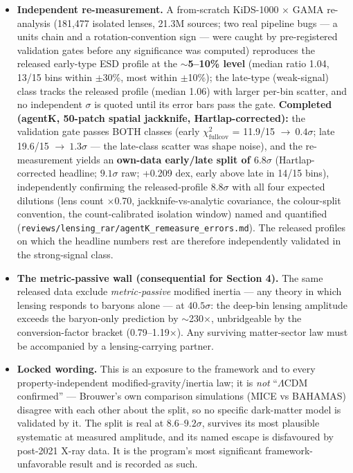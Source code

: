 \documentclass[11pt,a4paper]{article}
\begin{document}
\begin{itemize}
\item \textbf{Independent re-measurement.} A from-scratch KiDS-1000 $\times$ GAMA re-analysis (181,477 isolated lenses, 21.3M sources; two real pipeline bugs --- a units chain and a rotation-convention sign --- were caught by pre-registered validation gates before any significance was computed) reproduces the released early-type ESD profile at the \textbf{$\sim$5--10\% level} (median ratio 1.04, 13/15 bins within $\pm$30\%, most within $\pm$10\%); the late-type (weak-signal) class tracks the released profile (median 1.06) with larger per-bin scatter, and no independent $\sigma$ is quoted until its error bars pass the gate. \textbf{Completed (agentK, 50-patch spatial jackknife, Hartlap-corrected):} the validation gate passes BOTH classes (early $\chi^2_{\mathrm{fullcov}}$ = 11.9/15 $\to\ 0.4\sigma$; late 19.6/15 $\to\ 1.3\sigma$ --- the late-class scatter was shape noise), and the re-measurement yields an \textbf{own-data early/late split of $6.8\sigma$} (Hartlap-corrected headline; $9.1\sigma$ raw; +0.209 dex, early above late in 14/15 bins), independently confirming the released-profile $8.8\sigma$ with all four expected dilutions (lens count $\times$0.70, jackknife-vs-analytic covariance, the colour-split convention, the count-calibrated isolation window) named and quantified (\texttt{reviews/\allowbreak{}lensing\_\allowbreak{}rar/\allowbreak{}agentK\_\allowbreak{}remeasure\_\allowbreak{}errors.md}). The released profiles on which the headline numbers rest are therefore independently validated in the strong-signal class.

\item \textbf{The metric-passive wall (consequential for Section 4).} The same released data exclude \emph{metric-passive} modified inertia --- any theory in which lensing responds to baryons alone --- at \textbf{$40.5\sigma$}: the deep-bin lensing amplitude exceeds the baryon-only prediction by $\sim$230$\times$, unbridgeable by the conversion-factor bracket (0.79--1.19$\times$). Any surviving matter-sector law must be accompanied by a lensing-carrying partner.

\item \textbf{Locked wording.} This is an exposure to the framework and to every property-independent modified-gravity/inertia law; it is \emph{not} ``$\Lambda$CDM confirmed'' --- Brouwer's own comparison simulations (MICE vs BAHAMAS) disagree with each other about the split, so no specific dark-matter model is validated by it. The split is real at $8.6$--$9.2\sigma$, survives its most plausible systematic at measured amplitude, and its named escape is disfavoured by post-2021 X-ray data. It is the program's most significant framework-unfavorable result and is recorded as such.

\end{itemize}
\end{document}
